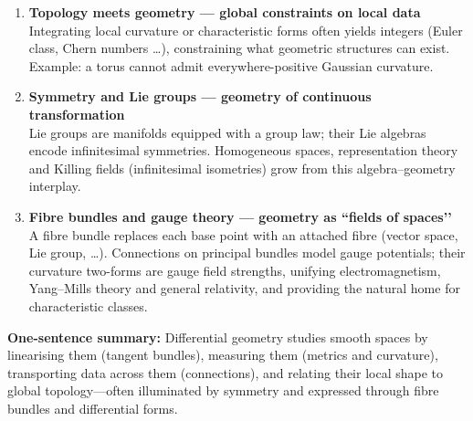 \documentclass[12pt]{article}
\theoremstyle{definition} %
\theoremstyle{plain} %
\begin{document}
\begin{enumerate}
  \item \textbf{Topology meets geometry — global constraints on local data}\\
        Integrating local curvature or characteristic forms often yields integers (Euler class, Chern numbers …), constraining what geometric structures can exist.  
        Example: a torus cannot admit everywhere-positive Gaussian curvature.

  \item \textbf{Symmetry and Lie groups — geometry of continuous transformation}\\
        Lie groups are manifolds equipped with a group law; their Lie algebras encode infinitesimal symmetries.  
        Homogeneous spaces, representation theory and Killing fields (infinitesimal isometries) grow from this algebra–geometry interplay.

  \item \textbf{Fibre bundles and gauge theory — geometry as “fields of spaces’’}\\
        A fibre bundle replaces each base point with an attached fibre (vector space, Lie group, …).  
        Connections on principal bundles model gauge potentials; their curvature two-forms are gauge field strengths, unifying electromagnetism, Yang–Mills theory and general relativity, and providing the natural home for characteristic classes.
\end{enumerate}

\bigskip
\noindent\textbf{One-sentence summary:}\;
Differential geometry studies smooth spaces by linearising them (tangent bundles), measuring them (metrics and curvature), transporting data across them (connections), and relating their local shape to global topology—often illuminated by symmetry and expressed through fibre bundles and differential forms.
\end{document}

